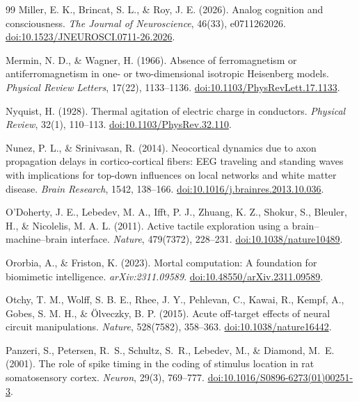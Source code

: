 \begin{thebibliography}{99}
 Miller, E. K., Brincat, S. L., \& Roy, J. E. (2026). Analog cognition and consciousness. \textit{The Journal of Neuroscience}, 46(33), e0711262026. \href{https://doi.org/10.1523/JNEUROSCI.0711-26.2026}{doi:10.1523/JNEUROSCI.0711-26.2026}.

 Mermin, N. D., \& Wagner, H. (1966). Absence of ferromagnetism or antiferromagnetism in one- or two-dimensional isotropic Heisenberg models. \textit{Physical Review Letters}, 17(22), 1133--1136. \href{https://doi.org/10.1103/PhysRevLett.17.1133}{doi:10.1103/PhysRevLett.17.1133}.

 Nyquist, H. (1928). Thermal agitation of electric charge in conductors. \textit{Physical Review}, 32(1), 110--113. \href{https://doi.org/10.1103/PhysRev.32.110}{doi:10.1103/PhysRev.32.110}.

 Nunez, P. L., \& Srinivasan, R. (2014). Neocortical dynamics due to axon propagation delays in cortico-cortical fibers: EEG traveling and standing waves with implications for top-down influences on local networks and white matter disease. \textit{Brain Research}, 1542, 138--166. \href{https://doi.org/10.1016/j.brainres.2013.10.036}{doi:10.1016/j.brainres.2013.10.036}.

 O'Doherty, J. E., Lebedev, M. A., Ifft, P. J., Zhuang, K. Z., Shokur, S., Bleuler, H., \& Nicolelis, M. A. L. (2011). Active tactile exploration using a brain--machine--brain interface. \textit{Nature}, 479(7372), 228--231. \href{https://doi.org/10.1038/nature10489}{doi:10.1038/nature10489}.

 Ororbia, A., \& Friston, K. (2023). Mortal computation: A foundation for biomimetic intelligence. \textit{arXiv:2311.09589}. \href{https://doi.org/10.48550/arXiv.2311.09589}{doi:10.48550/arXiv.2311.09589}.

 Otchy, T. M., Wolff, S. B. E., Rhee, J. Y., Pehlevan, C., Kawai, R., Kempf, A., Gobes, S. M. H., \& \"{O}lveczky, B. P. (2015). Acute off-target effects of neural circuit manipulations. \textit{Nature}, 528(7582), 358--363. \href{https://doi.org/10.1038/nature16442}{doi:10.1038/nature16442}.

 Panzeri, S., Petersen, R.~S., Schultz, S.~R., Lebedev, M., \& Diamond, M.~E. (2001). The role of spike timing in the coding of stimulus location in rat somatosensory cortex. \textit{Neuron}, 29(3), 769--777. \href{https://doi.org/10.1016/S0896-6273(01)00251-3}{doi:10.1016/S0896-6273(01)00251-3}.


\end{thebibliography}
